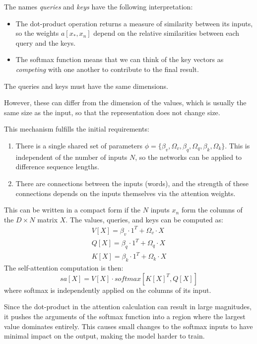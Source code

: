 The names \textit{queries} and \textit{keys} have the following interpretation:
\begin{itemize}
    \item The dot-product operation returns a measure of similarity between its inputs, so the weights $a[x_\ast, x_n]$ 
        depend on the relative similarities between each query and the keys.
    \item The softmax function means that we can think of the key vectors as \textit{competing} with one another to 
        contribute to the final result. 
\end{itemize}
The queries and keys must have the same dimensions. 

However, these can differ from the dimension of the values, which is 
usually the same size as the input, so that the representation does not change size.

This mechanism fulfills the initial requirements: 
\begin{enumerate}
    \item There is a single shared set of parameters $\phi = \{\beta_v, \Omega_v, \beta_q, \Omega_q, \beta_k, 
        \Omega_k\}$. This is independent of the number of inputs $N$, so the networks can be applied to difference 
        sequence lengths.
    \item There are connections between the inputs (words), and the strength of these connections depends on the inputs 
        themselves via the attention weights.
\end{enumerate}

This can be written in a compact form if the $N$ inputs $x_n$ form the columns of the $D \times N$ matrix $X$. The 
values, queries, and keys can be computed as:
\begin{align*}
        V[X] = \beta_v \cdot 1^T + \Omega_v \cdot X \\ 
        Q[X] = \beta_q \cdot 1^T + \Omega_q \cdot X \\
        K[X] = \beta_k \cdot 1^T + \Omega_k \cdot X
\end{align*}
The self-attention computation is then: 
\begin{equation}
    sa[X] = V[X] \cdot softmax[K[X]^T, Q[X]]
\end{equation}
where softmax is independently applied on the columns of its input.

Since the dot-product in the attention calculation can result in large magnitudes, it pushes the arguments of the softmax 
function into a region where the largest value dominates entirely. This causes small changes to the softmax inputs to 
have minimal impact on the output, making the model harder to train. 

